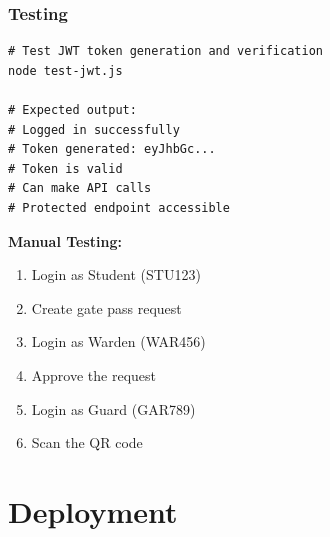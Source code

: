 \documentclass[11pt]{beamer}
\begin{document}
\begin{frame}
\frametitle{Testing}
\begin{lstlisting}
# Test JWT token generation and verification
node test-jwt.js

# Expected output:
# Logged in successfully
# Token generated: eyJhbGc...
# Token is valid
# Can make API calls
# Protected endpoint accessible
\end{lstlisting}

\vspace{1cm}
\textbf{Manual Testing:}
\begin{enumerate}
    \item Login as Student (STU123)
    \item Create gate pass request
    \item Login as Warden (WAR456)
    \item Approve the request
    \item Login as Guard (GAR789)
    \item Scan the QR code
\end{enumerate}
\end{frame}

\section{Deployment}
\end{document}

